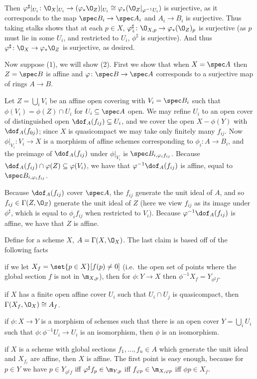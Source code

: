 Then $\phi^\sharp|_{U_i}\colon\O_X|_{U_i}\to(\phi_*\O_Z)|_{U_i}\cong\phi_*(\O_Z|_{\phi^{-1}U_i})$ is surjective, as it corresponds to the map $\spec B_i\to\spec A_i$ and $A_i\to B_i$
is surjective.
Thus taking stalks shows that at each $p\in X$, $\phi^\sharp_z\colon\O_{X,p}\to\phi_*(\O_Z)_p$ is surjective (as $p$ must lie in some $U_i$, and restricted to $U_i$, $\phi^\sharp$ is
surjective).
And thus $\phi^\sharp\colon\O_X\to\phi_*\O_Z$ is surjective, as desired.

Now suppose (1), we will show (2).
First we show that when $X=\spec A$ then $Z=\spec B$ is affine and $\phi\colon\spec B\to\spec A$ corresponds to a surjective map of rings $A\to B$.

Let $Z=\bigcup_iV_i$ be an affine open covering with $V_i=\spec B_i$ such that $\phi(V_i)=\phi(Z)\cap U_i$ for $U_i\subseteq\spec A$ open.
We may refine $U_i$ to an open cover of distinguished open $\dof_A(f_{ij})\subseteq U_i$, and we cover the open $X-\phi(Y)$ with $\dof_A(f_{0j})$; since $X$ is quasicompact
we may take only finitely many $f_{ij}$.
Now $\phi|_{V_i}\colon V_i\to X$ is a morphism of affine schemes corresponding to $\phi_i\colon A\to B_i$, and the preimage of $\dof_A(f_{ij})$ under $\phi|_{V_i}$
is $\spec B_{i,\phi_if_{ij}}$.
Because $\dof_A(f_{ij})\cap\phi(Z)\subseteq\phi(V_i)$, we have that $\phi^{-1}\dof_A(f_{ij})$ is affine, equal to $\spec B_{i,\phi_if_{ij}}$.

Because $\dof_A(f_{ij})$ cover $\spec A$, the $f_{ij}$ generate the unit ideal of $A$, and so $f_{ij}\in\Gamma(Z,\O_Z)$ generate the unit ideal of $Z$ (here
we view $f_{ij}$ as its image under $\phi^\sharp$, which is equal to $\phi_if_{ij}$ when restricted to $V_i$).
Because $\phi^{-1}\dof_A(f_{ij})$ is affine, we have that $Z$ is affine.

Define for a scheme $X$, $A=\Gamma(X,\O_X)$.
The last claim is based off of the following facts
\benum
    \item if we let $X_f=\set{p\in X}[f(p)\neq0]$ (i.e.\ the open set of points where the global section $f$ is not in $\m_{X,p}$),
    then for $\phi\colon Y\to X$ then $\phi^{-1}X_f=Y_{\phi^\sharp f}$.
    \item if $X$ has a finite open affine cover $U_i$ such that $U_i\cap U_j$ is quasicompact, then $\Gamma(X_f,\O_X)\cong A_f$.
    \item if $\phi\colon X\to Y$ is a morphism of schemes such that there is an open cover $Y=\bigcup_iU_i$ such that $\phi\colon\phi^{-1}U_i\to U_i$
    is an isomorphism, then $\phi$ is an isomorphism.
    \item if $X$ is a scheme with global sections $f_1,\dots,f_n\in A$ which generate the unit ideal and $X_{f_i}$ are affine,
    then $X$ is affine.
\eenum
The first point is easy enough, because for $p\in Y$ we have $p\in Y_{\phi^\sharp f}$ iff $\phi^\sharp f_p\in\m_{Y,p}$ iff $f_{\phi p}\in\m_{X,\phi p}$ iff $\phi p\in X_f$.

